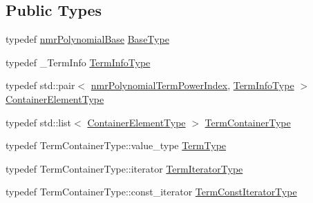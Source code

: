 \subsection*{Public Types}
\begin{DoxyCompactItemize}
\item 
typedef \hyperlink{classnmr_polynomial_base}{nmr\+Polynomial\+Base} \hyperlink{classnmr_polynomial_container_afcdfc28d7e6ba39198175c7a2cc5ed7d}{Base\+Type}
\item 
typedef \+\_\+\+Term\+Info \hyperlink{classnmr_polynomial_container_acc456652a77699f540082b3f285ac460}{Term\+Info\+Type}
\item 
typedef std\+::pair$<$ \hyperlink{classnmr_polynomial_term_power_index}{nmr\+Polynomial\+Term\+Power\+Index}, \hyperlink{classnmr_polynomial_container_acc456652a77699f540082b3f285ac460}{Term\+Info\+Type} $>$ \hyperlink{classnmr_polynomial_container_ae9c399b9034fb32315a644ebb103b4dd}{Container\+Element\+Type}
\item 
typedef std\+::list$<$ \hyperlink{classnmr_polynomial_container_ae9c399b9034fb32315a644ebb103b4dd}{Container\+Element\+Type} $>$ \hyperlink{classnmr_polynomial_container_ae9ba96ffe1b50f1cd84e6728c3a77128}{Term\+Container\+Type}
\item 
typedef Term\+Container\+Type\+::value\+\_\+type \hyperlink{classnmr_polynomial_container_a64089fefb243ca7cd6fc412083f9fa9d}{Term\+Type}
\item 
typedef Term\+Container\+Type\+::iterator \hyperlink{classnmr_polynomial_container_a276e57445d038e8a16462f47b85719a3}{Term\+Iterator\+Type}
\item 
typedef Term\+Container\+Type\+::const\+\_\+iterator \hyperlink{classnmr_polynomial_container_aba8d31506ab6a487fdc4fe2815469442}{Term\+Const\+Iterator\+Type}
\end{DoxyCompactItemize}
